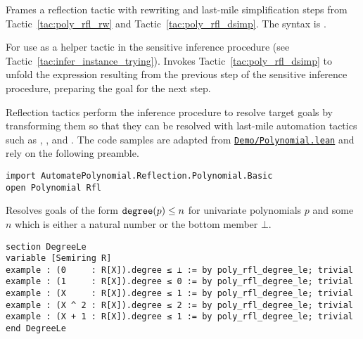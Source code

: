 \begin{tactic}
\label{tac:poly_rfl_with}
\leanok
{}
Frames a reflection tactic  with rewriting and last-mile simplification steps from Tactic~\ref{tac:poly_rfl_rw} and Tactic~\ref{tac:poly_rfl_dsimp}. The syntax is \leaninline{ <:> }.
\end{tactic}

\begin{tactic}
\label{tac:poly_infer_try}
\leanok
{}
For use as a helper tactic in the sensitive inference procedure (see Tactic~\ref{tac:infer_instance_trying}). Invokes Tactic~\ref{tac:poly_rfl_dsimp} to unfold the expression resulting from the previous step of the sensitive inference procedure, preparing the goal for the next step.
\end{tactic}


Reflection tactics perform the inference procedure to resolve target goals by transforming them so that they can be resolved with last-mile automation tactics such as , , and . The code samples are adapted from \href{https://github.com/LiamSchilling/AutomatePolynomial/tree/master/AutomatePolynomial/Demo/Polynomial.lean}{\texttt{Demo/Polynomial.lean}} and rely on the following preamble.

\begin{lstlisting}
import AutomatePolynomial.Reflection.Polynomial.Basic
open Polynomial Rfl
\end{lstlisting}

\begin{tactic}
\label{tac:poly_rfl_degree_le}
\leanok
{}
Resolves goals of the form $\mathtt{degree}(p) \leq n$ for univariate polynomials $p$ and some $n$ which is either a natural number or the bottom member $\bot$.
\begin{lstlisting}
section DegreeLe
variable [Semiring R]
example : (0     : R[X]).degree ≤ ⊥ := by poly_rfl_degree_le; trivial
example : (1     : R[X]).degree ≤ 0 := by poly_rfl_degree_le; trivial
example : (X     : R[X]).degree ≤ 1 := by poly_rfl_degree_le; trivial
example : (X ^ 2 : R[X]).degree ≤ 2 := by poly_rfl_degree_le; trivial
example : (X + 1 : R[X]).degree ≤ 1 := by poly_rfl_degree_le; trivial
end DegreeLe
\end{lstlisting}
\end{tactic}

